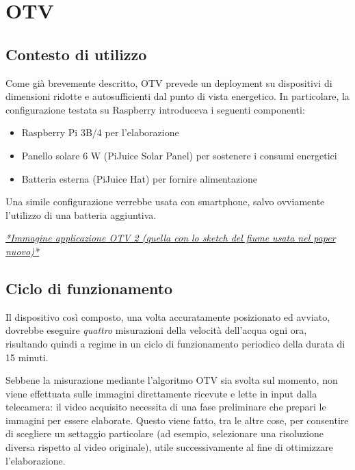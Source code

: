\chapter{OTV}
\section{Contesto di utilizzo}

Come già brevemente descritto, OTV prevede un deployment su dispositivi di dimensioni ridotte e autosufficienti dal punto di
vista energetico. In particolare, la configurazione testata su Raspberry introduceva i seguenti componenti:
\begin{itemize}
    \item Raspberry Pi 3B/4 per l'elaborazione
    \item Panello solare 6 W (PiJuice Solar Panel) per sostenere i consumi energetici
    \item Batteria esterna (PiJuice Hat) per fornire alimentazione
\end{itemize}
\cite{app11157027} Una simile configurazione verrebbe usata con smartphone, salvo ovviamente l'utilizzo di una batteria 
aggiuntiva.

\underline{\emph{*Immagine applicazione OTV 2 (quella con lo sketch del fiume usata nel paper nuovo)*}}

\section{Ciclo di funzionamento}
Il dispositivo così composto, una volta accuratamente posizionato ed avviato, dovrebbe eseguire \emph{quattro} misurazioni 
della velocità dell'acqua ogni ora, risultando quindi a regime in un ciclo di funzionamento periodico della durata di 15 minuti.

Sebbene la misurazione mediante l'algoritmo OTV sia svolta sul momento, non viene effettuata sulle immagini direttamente ricevute
e lette in input dalla telecamera: il video acquisito necessita di una fase preliminare che prepari le immagini per essere elaborate.
Questo viene fatto, tra le altre cose, per consentire di scegliere un settaggio particolare (ad esempio, selezionare una 
risoluzione diversa rispetto al video originale), utile successivamente al fine di ottimizzare l'elaborazione.

